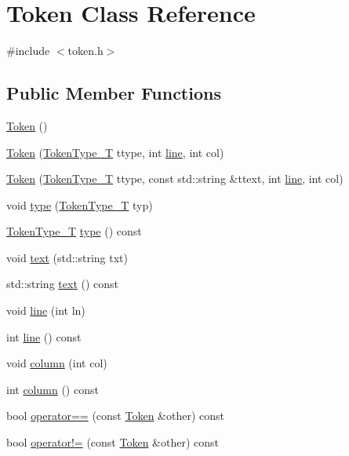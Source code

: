 \hypertarget{class_token}{\section{Token Class Reference}
\label{class_token}
}


{\ttfamily \#include $<$token.\-h$>$}

\subsection*{Public Member Functions}
\begin{DoxyCompactItemize}
\item 
\hyperlink{class_token_aa3c5868ba4115f3189df6b2ac5b36f39}{Token} ()
\item 
\hyperlink{class_token_a0b787b39aed3baf7cad3e3e68ed29fa6}{Token} (\hyperlink{token_8h_abf05bcc4c1b09928131e6afd3b768a77}{Token\-Type\-\_\-\-T} ttype, int \hyperlink{class_token_aa9f8fb673aae6d36dad03e3f5d1e5f77}{line}, int col)
\item 
\hyperlink{class_token_a19ae35e10dd99fca08017e0f883b1d6c}{Token} (\hyperlink{token_8h_abf05bcc4c1b09928131e6afd3b768a77}{Token\-Type\-\_\-\-T} ttype, const std\-::string \&ttext, int \hyperlink{class_token_aa9f8fb673aae6d36dad03e3f5d1e5f77}{line}, int col)
\item 
void \hyperlink{class_token_af7a5db637926db45f92522f7bc207207}{type} (\hyperlink{token_8h_abf05bcc4c1b09928131e6afd3b768a77}{Token\-Type\-\_\-\-T} typ)
\item 
\hyperlink{token_8h_abf05bcc4c1b09928131e6afd3b768a77}{Token\-Type\-\_\-\-T} \hyperlink{class_token_a94ffaaf2ec54ac87397607e9af567df8}{type} () const 
\item 
void \hyperlink{class_token_a30e84cfd0f4ac2c71f59366088787d8e}{text} (std\-::string txt)
\item 
std\-::string \hyperlink{class_token_ae8915cc9838cf9e08ff6c7c39fd81ed2}{text} () const 
\item 
void \hyperlink{class_token_aa9f8fb673aae6d36dad03e3f5d1e5f77}{line} (int ln)
\item 
int \hyperlink{class_token_a8e3d3bce7ab65c33abadab8fc0aa2f46}{line} () const 
\item 
void \hyperlink{class_token_a1b21e17c8d9b12f84147656d03492b57}{column} (int col)
\item 
int \hyperlink{class_token_ae814a8d1293aa3e17fcff49a655fde92}{column} () const 
\item 
bool \hyperlink{class_token_a4b0d7419c692350d4b28b947956e7e82}{operator==} (const \hyperlink{class_token}{Token} \&other) const 
\item 
bool \hyperlink{class_token_a44c1e0a6d1880cb378e7b43178db4e08}{operator!=} (const \hyperlink{class_token}{Token} \&other) const 
\end{DoxyCompactItemize}


